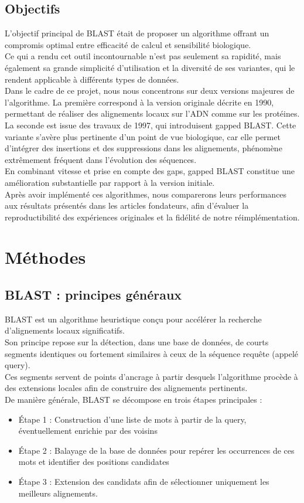 \documentclass[conference]{IEEEtran}
\begin{document}
\subsection{Objectifs}
L’objectif principal de BLAST était de proposer un algorithme offrant un compromis optimal entre efficacité de calcul et sensibilité biologique.\\
Ce qui a rendu cet outil incontournable n’est pas seulement sa rapidité, mais également sa grande simplicité d’utilisation et la diversité de ses variantes, qui le rendent applicable à différents types de données.\\
Dans le cadre de ce projet, nous nous concentrons sur deux versions majeures de l’algorithme. La première correspond à la version originale décrite en 1990, permettant de réaliser des alignements locaux sur l’ADN comme sur les protéines. La seconde est issue des travaux de 1997, qui introduisent gapped BLAST. Cette variante s’avère plus pertinente d’un point de vue biologique, car elle permet d’intégrer des insertions et des suppressions dans les alignements, phénomène extrêmement fréquent dans l’évolution des séquences.\\
En combinant vitesse et prise en compte des gaps, gapped BLAST constitue une amélioration substantielle par rapport à la version initiale.\\
Après avoir implémenté ces algorithmes, nous comparerons leurs performances aux résultats présentés dans les articles fondateurs, afin d’évaluer la reproductibilité des expériences originales et la fidélité de notre réimplémentation.

\section{Méthodes}

\subsection{BLAST : principes généraux}
BLAST est un algorithme heuristique conçu pour accélérer la recherche d’alignements locaux significatifs.\\
Son principe repose sur la détection, dans une base de données, de courts segments identiques ou fortement similaires à ceux de la séquence requête (appelé query).\\
Ces segments servent de points d’ancrage à partir desquels l’algorithme procède à des extensions locales afin de construire des alignements pertinents.\\
De manière générale, BLAST se décompose en trois étapes principales :
\begin{itemize}
\item Étape 1 : Construction d’une liste de mots à partir de la query, éventuellement enrichie par des voisins
\item Étape 2 : Balayage de la base de données pour repérer les occurrences de ces mots et identifier des positions candidates
\item Étape 3 : Extension des candidats afin de sélectionner uniquement les meilleurs alignements.
\end{itemize}
\end{document}
